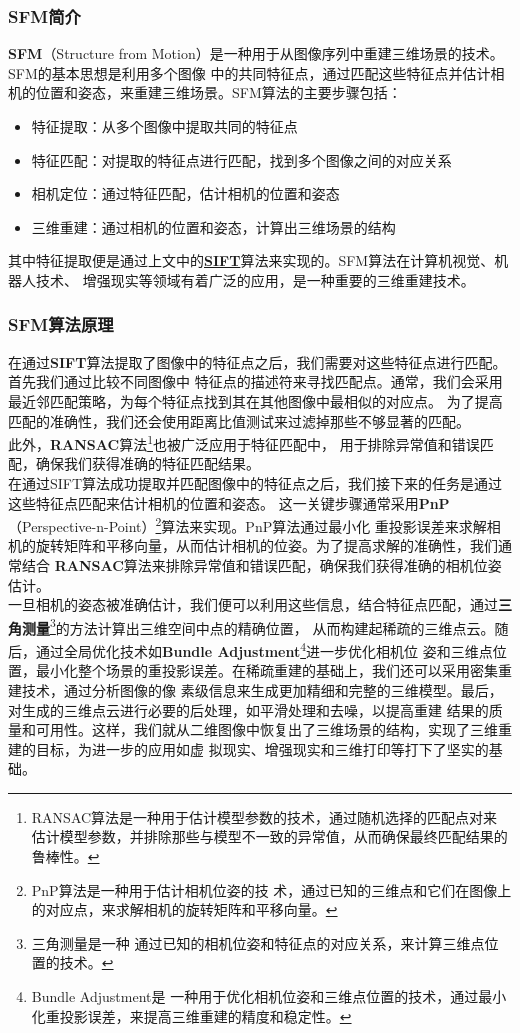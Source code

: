 \documentclass{nwputhesis}
\begin{document}
\subsubsection{SFM简介}
\textbf{SFM}（Structure from Motion）是一种用于从图像序列中重建三维场景的技术。SFM的基本思想是利用多个图像
中的共同特征点，通过匹配这些特征点并估计相机的位置和姿态，来重建三维场景。SFM算法的主要步骤包括：
\begin{itemize}
    \item 特征提取：从多个图像中提取共同的特征点
    \item 特征匹配：对提取的特征点进行匹配，找到多个图像之间的对应关系
    \item 相机定位：通过特征匹配，估计相机的位置和姿态
    \item 三维重建：通过相机的位置和姿态，计算出三维场景的结构
\end{itemize}
\indent
其中特征提取便是通过上文中的\textbf{\hyperlink{SIFT}{SIFT}}算法来实现的。SFM算法在计算机视觉、机器人技术、
增强现实等领域有着广泛的应用，是一种重要的三维重建技术。
\subsubsection{SFM算法原理}
\indent
在通过\textbf{SIFT}算法提取了图像中的特征点之后，我们需要对这些特征点进行匹配。首先我们通过比较不同图像中
特征点的描述符来寻找匹配点。通常，我们会采用最近邻匹配策略，为每个特征点找到其在其他图像中最相似的对应点。
为了提高匹配的准确性，我们还会使用距离比值测试来过滤掉那些不够显著的匹配。\\
\indent
此外，\textbf{RANSAC}算法\footnote{RANSAC算法是一种用于估计模型参数的技术，通过随机选择的匹配点对来
估计模型参数，并排除那些与模型不一致的异常值，从而确保最终匹配结果的鲁棒性。}也被广泛应用于特征匹配中，
用于排除异常值和错误匹配，确保我们获得准确的特征匹配结果。
\\
\indent
在通过SIFT算法成功提取并匹配图像中的特征点之后，我们接下来的任务是通过这些特征点匹配来估计相机的位置和姿态。
这一关键步骤通常采用\textbf{PnP}（Perspective-n-Point）\footnote{PnP算法是一种用于估计相机位姿的技
术，通过已知的三维点和它们在图像上的对应点，来求解相机的旋转矩阵和平移向量。}算法来实现。PnP算法通过最小化
重投影误差来求解相机的旋转矩阵和平移向量，从而估计相机的位姿。为了提高求解的准确性，我们通常结合
\textbf{RANSAC}算法来排除异常值和错误匹配，确保我们获得准确的相机位姿估计。\\
\indent
一旦相机的姿态被准确估计，我们便可以利用这些信息，结合特征点匹配，通过\textbf{三角测量}\footnote{三角测量是一种
通过已知的相机位姿和特征点的对应关系，来计算三维点位置的技术。}的方法计算出三维空间中点的精确位置，
从而构建起稀疏的三维点云。随后，通过全局优化技术如\textbf{Bundle Adjustment}\footnote{Bundle Adjustment是
一种用于优化相机位姿和三维点位置的技术，通过最小化重投影误差，来提高三维重建的精度和稳定性。}进一步优化相机位
姿和三维点位置，最小化整个场景的重投影误差。在稀疏重建的基础上，我们还可以采用密集重建技术，通过分析图像的像
素级信息来生成更加精细和完整的三维模型。最后，对生成的三维点云进行必要的后处理，如平滑处理和去噪，以提高重建
结果的质量和可用性。这样，我们就从二维图像中恢复出了三维场景的结构，实现了三维重建的目标，为进一步的应用如虚
拟现实、增强现实和三维打印等打下了坚实的基础。\\
\end{document}
